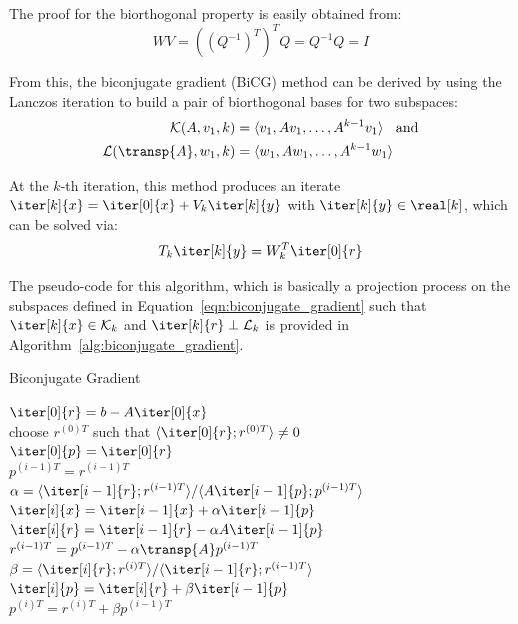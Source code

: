 \noindent The proof for the biorthogonal property is easily obtained from:
\begin{equation}
    WV=((Q^{-1})^T)^TQ = Q^{-1}Q = I
\end{equation}

\noindent From this, the biconjugate gradient (BiCG) method can be derived by using the Lanczos iteration to build a pair of biorthogonal bases for two subspaces:
\begin{equation}
\label{eqn:biconjugate_gradient}
    \begin{aligned}
    \mathcal{K}(A,v_1,k) &= \langle v_1, Av_1, \dots, A^{k-1}v_1\rangle \;\; \text{ and}\\
    \mathcal{L}(\transp{A},w_1,k) &= \langle w_1, Aw_1, \dots, A^{k-1}w_1 \rangle
    \end{aligned}
\end{equation}

\noindent At the $k$-th iteration, this method produces an iterate $\iter[k]{x}=\iter[0]{x}+V_k\iter[k]{y}$ with $\iter[k]{y} \in \real[k]$, which can be solved via:
\begin{equation}
    T_k\iter[k]{y}=W_k^T\iter[0]{r}
\end{equation}

\noindent The pseudo-code for this algorithm, which is basically a projection process on the subspaces defined in Equation~\hyperref[eqn:biconjugate_gradient]{\ref{eqn:biconjugate_gradient}} such that $\iter[k]{x} \in \mathcal{K}_k$ and $\iter[k]{r} \perp \mathcal{L}_k$ is provided in Algorithm~\hyperref[alg:biconjugate_gradient]{\ref{alg:biconjugate_gradient}}.

\begin{algorithm}[h]
  \caption{Biconjugate Gradient}
  \label{alg:biconjugate_gradient}
  \SetAlgoLined
  \DontPrintSemicolon
  $\iter[0]{r} = b-A\iter[0]{x}$ \\
  choose $r^{(0)T}$ such that $\langle \iter[0]{r}; r^{(0)T}\rangle \neq 0$\\
  $\iter[0]{p} = \iter[0]{r}$ \\
  $p^{(i-1)T} = r^{(i-1)T}$ \\
   {
    $\alpha = \langle \iter[i-1]{r};r^{(i-1)T} \rangle / \langle A\iter[i-1]{p};p^{(i-1)T} \rangle$ \\
    $\iter[i]{x} = \iter[i-1]{x}+\alpha \iter[i-1]{p}$ \\
    $\iter[i]{r} = \iter[i-1]{r} - \alpha A\iter[i-1]{p}$ \\
    $r^{(i-1)T} = p^{(i-1)T} -\alpha \transp{A} p^{(i-1)T}$ \\
    $\beta = \langle \iter[i]{r};r^{(i)T} \rangle / \langle \iter[i-1]{r};r^{(i-1)T} \rangle$ \\
    $\iter[i]{p} = \iter[i]{r} + \beta \iter[i-1]{p}$ \\
    $p^{(i)T} = r^{(i)T} + \beta p^{(i-1)T}$ \\
  }
\end{algorithm}

